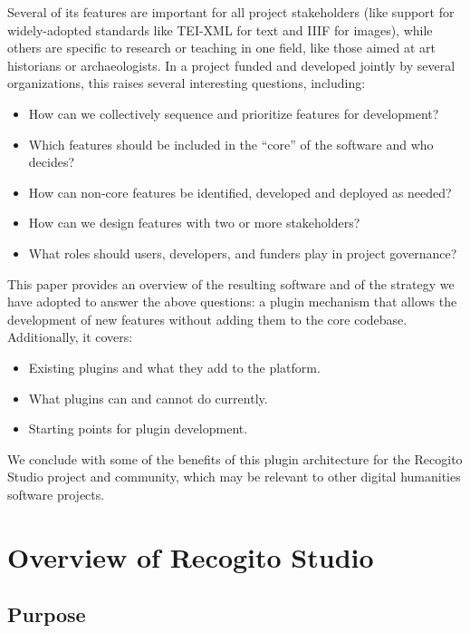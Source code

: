 \documentclass[final]{anthology-ch}         %
\begin{document}
Several of its features are important for all project stakeholders (like support for widely-adopted standards like TEI-XML for text and IIIF for images), while others are specific to research or teaching in one field, like those aimed at art historians or archaeologists. In a project funded and developed jointly by several organizations, this raises several interesting questions, including:

\begin{itemize}
  \item How can we collectively sequence and prioritize features for development?
  \item Which features should be included in the ``core'' of the software and who decides?
  \item How can non-core features be identified, developed and deployed as needed?
  \item How can we design features with two or more stakeholders?
  \item What roles should users, developers, and funders play in project governance?
\end{itemize}

This paper provides an overview of the resulting software and of the strategy we have adopted to answer the above questions: a plugin mechanism that allows the development of new features without adding them to the core codebase. Additionally, it covers:

\begin{itemize}
  \item Existing plugins and what they add to the platform.
  \item What plugins can and cannot do currently.
  \item Starting points for plugin development.
\end{itemize}

We conclude with some of the benefits of this plugin architecture for the Recogito Studio project and community, which may be relevant to other digital humanities software projects.

\section{Overview of Recogito Studio}

\subsection{Purpose} \label{sec:overview_purpose}
\end{document}
